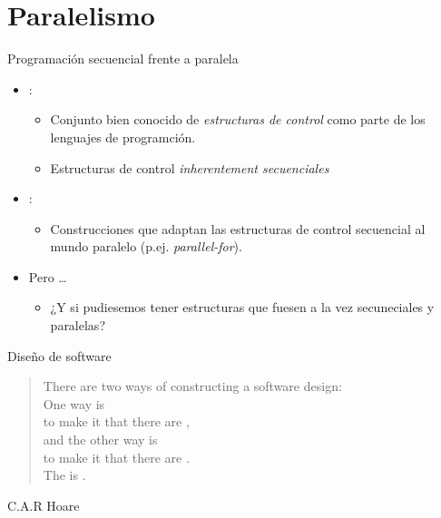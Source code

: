 \section{Paralelismo}

\begin{frame}[t]{Programación secuencial frente a paralela}
\begin{itemize}
  \item {}:
    \begin{itemize}
      \item Conjunto bien conocido de \emph{estructuras de control}
            como parte de los lenguajes de programción.
      \item Estructuras de control \emph{inherentement secuenciales}
    \end{itemize}

  \vfill\pause
  \item {}:
    \begin{itemize}
      \item Construcciones que adaptan las estructuras de control
            secuencial al mundo paralelo (p.ej. \emph{parallel-for}).
    \end{itemize}

  \vfill\pause
  \item Pero \ldots
    \begin{itemize}
      \item ¿Y si pudiesemos tener estructuras que fuesen a la vez
            secuneciales y paralelas?
    \end{itemize}
\end{itemize}
\end{frame}

\begin{frame}[t]{Diseño de software}

\begin{quote}
There are two ways of constructing a software design:\\ 
\vspace{1em}
\pause
One way is\\
\pause
to make it  that there are ,\\
\pause
\vspace{.5em}
and the other way is\\
\pause
to make it  that there are .\\ 
\vspace{1em}
\pause
The  is . 
\end{quote}
\hfill C.A.R Hoare
\end{frame}

